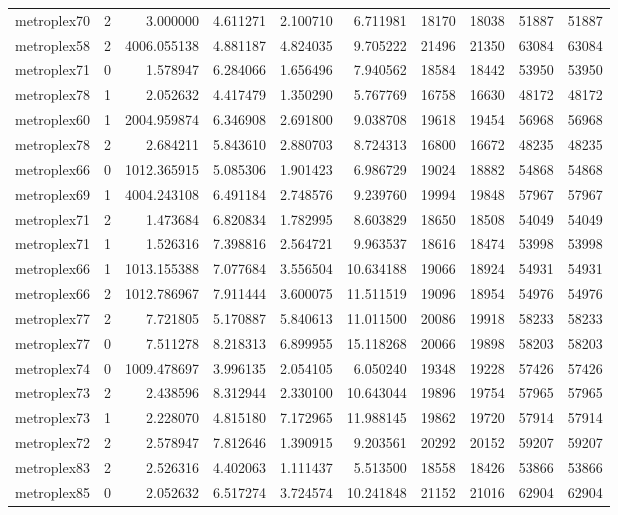 \begin{longtable}{|l|r|r|r|r|r|r|r|r|r|}
metroplex70 & 2 & 3.000000 & 4.611271 & 2.100710 & 6.711981 & 18170 & 18038 & 51887 & 51887 \\
metroplex58 & 2 & 4006.055138 & 4.881187 & 4.824035 & 9.705222 & 21496 & 21350 & 63084 & 63084 \\
metroplex71 & 0 & 1.578947 & 6.284066 & 1.656496 & 7.940562 & 18584 & 18442 & 53950 & 53950 \\
metroplex78 & 1 & 2.052632 & 4.417479 & 1.350290 & 5.767769 & 16758 & 16630 & 48172 & 48172 \\
metroplex60 & 1 & 2004.959874 & 6.346908 & 2.691800 & 9.038708 & 19618 & 19454 & 56968 & 56968 \\
metroplex78 & 2 & 2.684211 & 5.843610 & 2.880703 & 8.724313 & 16800 & 16672 & 48235 & 48235 \\
metroplex66 & 0 & 1012.365915 & 5.085306 & 1.901423 & 6.986729 & 19024 & 18882 & 54868 & 54868 \\
metroplex69 & 1 & 4004.243108 & 6.491184 & 2.748576 & 9.239760 & 19994 & 19848 & 57967 & 57967 \\
metroplex71 & 2 & 1.473684 & 6.820834 & 1.782995 & 8.603829 & 18650 & 18508 & 54049 & 54049 \\
metroplex71 & 1 & 1.526316 & 7.398816 & 2.564721 & 9.963537 & 18616 & 18474 & 53998 & 53998 \\
metroplex66 & 1 & 1013.155388 & 7.077684 & 3.556504 & 10.634188 & 19066 & 18924 & 54931 & 54931 \\
metroplex66 & 2 & 1012.786967 & 7.911444 & 3.600075 & 11.511519 & 19096 & 18954 & 54976 & 54976 \\
metroplex77 & 2 & 7.721805 & 5.170887 & 5.840613 & 11.011500 & 20086 & 19918 & 58233 & 58233 \\
metroplex77 & 0 & 7.511278 & 8.218313 & 6.899955 & 15.118268 & 20066 & 19898 & 58203 & 58203 \\
metroplex74 & 0 & 1009.478697 & 3.996135 & 2.054105 & 6.050240 & 19348 & 19228 & 57426 & 57426 \\
metroplex73 & 2 & 2.438596 & 8.312944 & 2.330100 & 10.643044 & 19896 & 19754 & 57965 & 57965 \\
metroplex73 & 1 & 2.228070 & 4.815180 & 7.172965 & 11.988145 & 19862 & 19720 & 57914 & 57914 \\
metroplex72 & 2 & 2.578947 & 7.812646 & 1.390915 & 9.203561 & 20292 & 20152 & 59207 & 59207 \\
metroplex83 & 2 & 2.526316 & 4.402063 & 1.111437 & 5.513500 & 18558 & 18426 & 53866 & 53866 \\
metroplex85 & 0 & 2.052632 & 6.517274 & 3.724574 & 10.241848 & 21152 & 21016 & 62904 & 62904 \\

\end{longtable}

